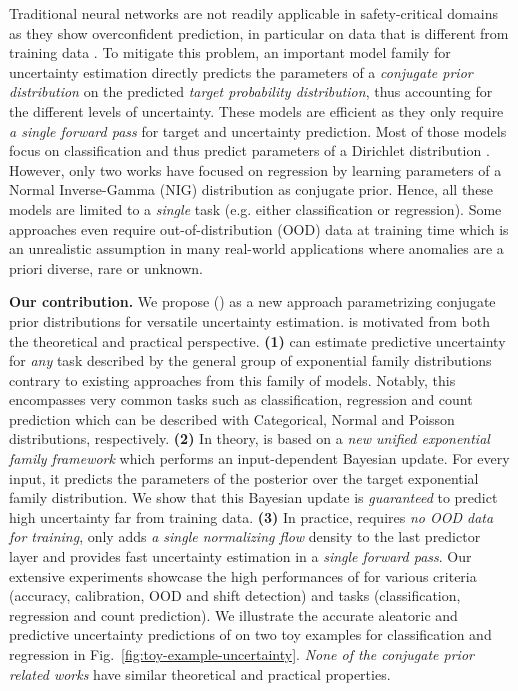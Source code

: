 Traditional neural networks are not readily applicable in safety-critical domains as they show overconfident prediction, in particular on data that is different from training data \citep{calibration-network, ensembles}. To mitigate this problem, an important model family for uncertainty estimation directly predicts the parameters of a \emph{conjugate prior distribution} on the predicted \emph{target probability distribution}, thus accounting for the different levels of uncertainty. These models are efficient as they only require \emph{a single forward pass} for target and uncertainty prediction. Most of those models focus on classification and thus predict parameters of a Dirichlet distribution \citep{uceloss,postnet,priornet,reverse-kl,max_gap_id_ood,uncertainty-generative-classifier,multifaceted_uncertainty,graph_posterior,graph_uncertainty, lightweight-prob-net}. However, only two works \citep{evidential-regression, regression-priornet} have focused on regression by learning parameters of a Normal Inverse-Gamma (NIG) distribution as conjugate prior. Hence, all these models are limited to a \emph{single} task (e.g. either classification or regression). Some approaches even require out-of-distribution (OOD) data at training time \citep{priornet, reverse-kl} which is an unrealistic assumption in many real-world applications where anomalies are a priori diverse, rare or unknown.

\textbf{Our contribution.} We propose \NatPN{} (\NatPNacro{}) as a new approach parametrizing conjugate prior distributions for versatile uncertainty estimation. \NatPNacro{}{} is motivated from both the theoretical and practical perspective. 
\textbf{(1)} \NatPNacro{} can estimate predictive uncertainty for \emph{any} task described by the general group of exponential family distributions contrary to existing approaches from this family of models. Notably, this encompasses very common tasks such as classification, regression and count prediction which can be described with Categorical, Normal and Poisson distributions, respectively. 
\textbf{(2)} In theory, \NatPNacro{} is based on a \emph{new unified exponential family framework} which performs an input-dependent Bayesian update. For every input, it predicts the parameters of the posterior over the target exponential family distribution. We show that this Bayesian update is \emph{guaranteed} to predict high uncertainty far from training data.
\textbf{(3)} In practice, \NatPNacro{} requires \emph{no OOD data for training}, only adds \emph{a single normalizing flow} density to the last predictor layer and provides fast uncertainty estimation in a \emph{single forward pass}. Our extensive experiments showcase the high performances of \NatPNacro{} for various criteria (accuracy, calibration, OOD and shift detection) and tasks (classification, regression and count prediction). We illustrate the accurate aleatoric and predictive uncertainty predictions of \NatPNacro{} on two toy examples for classification and regression in Fig.~\ref{fig:toy-example-uncertainty}. \emph{None of the conjugate prior related works} have similar theoretical and practical properties.

